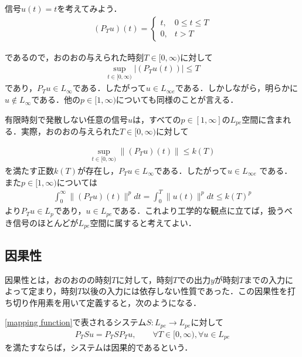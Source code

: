 \documentclass[a4paper,11pt,uplatex]{jsarticle} %
\theoremstyle{definition}	%
\begin{document}
\begin{tcolorbox}[title=例5.3,
drop small lifted shadow=black]
信号$u(t)=t$を考えてみよう．
\begin{align}
\label{eq1:example5.3}
(P_T u )(t) =
\begin{cases}
    t, &  0 \leq t \leq T \\
    0, &  t   >   T
\end{cases}
\end{align}

であるので，おのおの与えられた時刻$T \in [0, \infty ) $に対して
\begin{align}
\label{eq2:example5.3}
\sup_{t \in [0, \infty )} | (P_T u (t)) | \leq T
\end{align}
であり，$P_T u \in L_\infty$である．したがって$u \in L_{\infty e}$である．しかしながら，明らかに$u \notin L_\infty $である．他の$p \in [1, \infty)$についても同様のことが言える．
\end{tcolorbox}


有限時刻で発散しない任意の信号$u$は，すべての$p \in [1, \infty]$の$L_{pe}$空間に含まれる．実際，おのおの与えられた$T \in [0, \infty)$に対して

\begin{align}
\label{eq3:augmented L_pe space}
\sup_{t \in [0, \infty)} \| (P_T u) (t) \| \leq k(T)
\end{align}
を満たす正数$k(T)$が存在し，$P_T u \in L_\infty $である．したがって$u \in L_{\infty e} $ である．
また$p \in [1, \infty)$については
\begin{align}
\label{eq4:augmented L_pe space}
\int^\infty_0 \| (P_T u) (t) \| ^p dt = \int^T_0 \| u(t) \|^p dt \leq k(T)^p
\end{align}
より$P_T u \in L_p$であり，$u \in L_{pe}$である．これより工学的な観点に立てば，扱うべき信号のほとんどが$L_{pe}$空間に属すると考えてよい．

\subsection{因果性}
因果性とは，おのおのの時刻$T$に対して，時刻$T$での出力$y$が時刻$T$までの入力によって定まり，時刻$T$以後の入力には依存しない性質であった．この因果性を打ち切り作用素を用いて定義すると，次のようになる．

\begin{tcolorbox}[title=定義5.1,
drop small lifted shadow=black]
\eqref{mapping function}で表されるシステム$S: L_{pe} \to L_{pe}$に対して
\begin{align}
\label{causality}
P_T S u = P_T S P_T u, \qquad \forall T \in [0, \infty ), \forall u \in L_{pe}
\end{align}
を満たすならば，システムは因果的であるという．
\end{tcolorbox}
\end{document}
